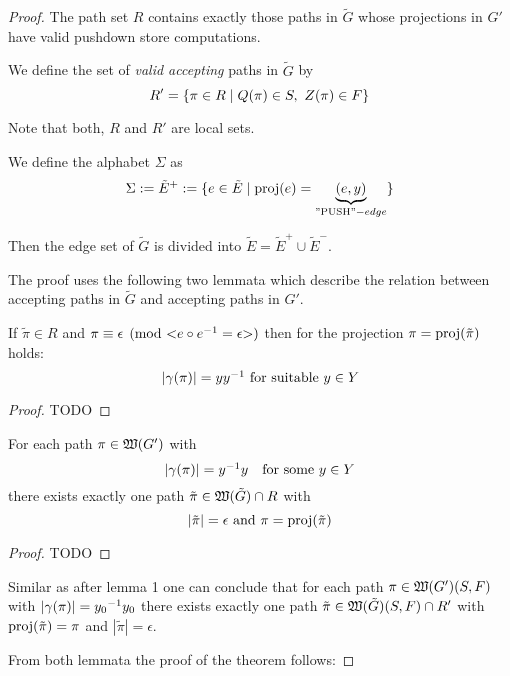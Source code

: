 \begin{proof}
The path set $R$ contains exactly those paths in $\tilde{G}$ whose projections
in $G'$ have valid pushdown store computations.

We define the set of {\em valid accepting} paths in $\tilde{G}$ by
\begin{equation*}
R' = \mbox{$\{\pi \in R \mid Q(\pi) \in S,\ Z(\pi) \in F\}$}
\end{equation*}

Note that both, $R$ and $R'$ are local sets.

We define the alphabet $\Sigma$ as 
\begin{equation*}
\Sigma := \tilde{E}^+ := \mbox{$\{e \in \tilde{E} \mid \mathrm{proj}({e}) =
\underbrace{(e,y)}_{\text{''PUSH''}-edge}\}$}
\end{equation*}

Then the edge set of $\tilde{G}$ is divided into $\tilde{E} = \tilde{E}^+ \cup
\tilde{E}^-$.

The proof uses the following two lemmata which describe the relation between
accepting paths in $\tilde{G}$ and accepting paths in $G'$.

\begin{lemma}
If $\tilde{\pi} \in R$ and $\pi \equiv \epsilon \pmod{{<}e\circ \mbox{${e}^{-1}$} =
\epsilon{>}}$ then for the projection $\pi = \mathrm{proj}({\tilde{\pi}})$ holds:
\[ |\gamma(\pi)| = y \mbox{${y}^{-1}$}\text{ for suitable }y \in Y \]
\end{lemma}

\begin{proof}
TODO
\end{proof}

\begin{lemma}
For each path $\pi \in \mbox{$\mathfrak{W}({G'})$}$ with
\[ |\gamma(\pi)| = \mbox{${y}^{-1}$} y \quad\text{for some }y \in Y \]
there exists exactly one path $\tilde{\pi} \in \mbox{$\mathfrak{W}({\tilde{G}})$} \cap R$ with
\[ |\tilde{\pi}| = \epsilon\text{ and }\pi = \mathrm{proj}({\tilde{\pi}}) \] 
\end{lemma}

\begin{proof}
TODO
\end{proof}

Similar as after lemma 1 one can conclude that for each path $\pi \in
\mbox{$\mathfrak{W}({G'})$}(S, F)$ with $|\gamma(\pi)| = \mbox{${y_0}^{-1}$}y_0$ there exists exactly one
path $\tilde{\pi} \in \mbox{$\mathfrak{W}({\tilde{G}})$}(S, F) \cap R'$ with
$\mathrm{proj}({\tilde{\pi}}) = \pi$ and $|\tilde{\pi}| = \epsilon$.

From both lemmata the proof of the theorem follows:


\end{proof}

